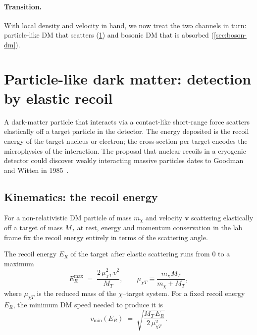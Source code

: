 \paragraph{Transition.}
With local density and velocity in hand, we now treat the two
channels in turn: particle-like DM that scatters
(\cref{sec:fermion-dm}) and bosonic DM that is absorbed
(\cref{sec:boson-dm}).

\section{Particle-like dark matter: detection by elastic recoil}
\label{sec:fermion-dm}

\begin{phenomenon}
A dark-matter particle that interacts via a contact-like
short-range force scatters elastically off a target particle in
the detector. The energy deposited is the recoil energy of the
target nucleus or electron; the cross-section per target encodes
the microphysics of the interaction. The proposal that nuclear
recoils in a cryogenic detector could discover weakly interacting
massive particles dates to Goodman and Witten in
1985~\cite{goodman1985}.
\end{phenomenon}

\subsection{Kinematics: the recoil energy}
\label{sec:recoil-kinematics}

For a non-relativistic DM particle of mass $m_\chi$ and velocity
$\bm v$ scattering elastically off a target of mass $M_T$ at rest,
energy and momentum conservation in the lab frame fix the recoil
energy entirely in terms of the scattering angle.

\begin{statement}
\label{stmt:recoil-energy}
The recoil energy $E_R$ of the target after elastic scattering
runs from $0$ to a maximum
\begin{equation}
\label{eq:E_R-max}
E_R^\text{max} \;=\; \frac{2\,\mu_{\chi T}^2\,v^2}{M_T},
\qquad
\mu_{\chi T}\equiv\frac{m_\chi M_T}{m_\chi+M_T},
\end{equation}
where $\mu_{\chi T}$ is the reduced mass of the $\chi$--target
system. For a fixed recoil energy $E_R$, the minimum DM speed
needed to produce it is
\begin{equation}
\label{eq:v-min}
v_\text{min}(E_R) \;=\; \sqrt{\frac{M_T\,E_R}{2\,\mu_{\chi T}^2}}.
\end{equation}
\end{statement}

